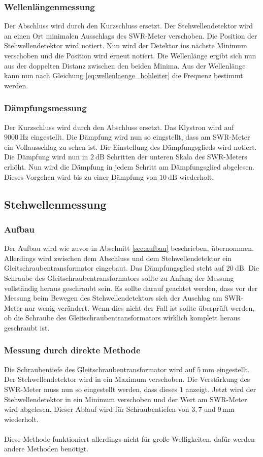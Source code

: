 \subsubsection{Wellenlängenmessung}
Der Abschluss wird durch den Kurzschluss ersetzt.
Der Stehwellendetektor wird an einen Ort minimalen Ausschlags des SWR-Meter verschoben.
Die Position der Stehwellendetektor wird notiert.
Nun wird der Detektor ins nächste Minimum verschoben und die Position wird erneut notiert.
Die Wellenlänge ergibt sich nun aus der doppelten Distanz zwischen den beiden Minima.
Aus der Wellenlänge kann nun nach Gleichung \ref{eq:wellenlaenge_hohleiter} die Frequenz bestimmt werden.

\subsubsection{Dämpfungsmessung}
Der Kurzschluss wird durch den Abschluss ersetzt.
Das Klystron wird auf $\SI{9000}{\Hz}$ eingestellt.
Die Dämpfung wird nun so eingstellt, dass am SWR-Meter ein Vollausschlag zu sehen ist.
Die Einstellung des Dämpfungsglieds wird notiert.
Die Dämpfung wird nun in $\SI{2}{\dB}$ Schritten der unteren Skala des SWR-Meters erhöht.
Nun wird die Dämpfung in jedem Schritt am Dämpfungsglied abgelesen.
Dieses Vorgehen wird bis zu einer Dämpfung von $\SI{10}{\dB}$ wiederholt.

\subsection{Stehwellenmessung}
\subsubsection{Aufbau}
Der Aufbau wird wie zuvor in Abschnitt \ref{sec:aufbau} beschrieben, übernommen.
Allerdings wird zwischen dem Abschluss und dem Stehwellendetektor ein Gleitschraubentransformator eingebaut.
Das Dämpfungsglied steht auf $\SI{20}{\dB}$.
Die Schraube des Gleitschraubentransformators sollte zu Anfang der Messung vollständig heraus geschraubt sein.
Es sollte darauf geachtet werden, dass vor der Messung beim Bewegen des Stehwellendetektors sich der Auschlag am SWR-Meter nur wenig verändert.
Wenn dies nicht der Fall ist sollte überprüft werden, ob die Schraube des Gleitschraubentransformators wirklich komplett heraus geschraubt ist.

\subsubsection{Messung durch direkte Methode}
Die Schraubentiefe des Gleitschraubentransformator wird auf $\SI{5}{\milli\meter}$ eingestellt.
Der Stehwellendetektor wird in ein Maximum verschoben.
Die Verstärkung des SWR-Meter muss nun so eingestellt werden, dass dieses $1$ anzeigt.
Jetzt wird der Stehwellendetektor in ein Minimum verschoben und der Wert am SWR-Meter wird abgelesen.
Dieser Ablauf wird für Schraubentiefen von $3,7 \; \text{und} \; 9 \, \si{\milli\meter}$ wiederholt.
\\\\
Diese Methode funktioniert allerdings nicht für große Welligkeiten, dafür werden andere Methoden benötigt.
